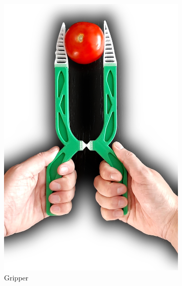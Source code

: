 \begin{figure}
	\setlength{\figheight}{.5\columnwidth}
	\centering
	\begin{subfigure}[B]{.35\columnwidth}
		\centering
		\includegraphics[height=\figheight]{sources/applications/gripper.jpg}
		\caption{Gripper}
	\end{subfigure}
	\begin{subfigure}[B]{.3\columnwidth}
		\centering

\end{subfigure}
\end{figure}
